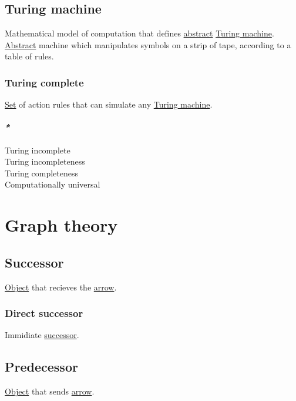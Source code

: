 \documentclass[a4paper,14pt,oneside]{book}
\begin{document}
\section{\label{org81c6fd8}Turing machine}
\label{sec:orgde2b43d}
Mathematical model of computation that defines \hyperref[org939195a]{abstract} \hyperref[org81c6fd8]{Turing machine}. \hyperref[org939195a]{Abstract} machine which manipulates symbols on a strip of tape, according to a table of rules.\\

\subsection{\label{orgddc98d2}Turing complete}
\label{sec:org16b19a2}

\hyperref[orgc6fbcf3]{Set} of action rules that can simulate any \hyperref[org81c6fd8]{Turing machine}.\\

\subsubsection{\emph{*}}
\label{sec:org5905706}

\label{orgc61f247}Turing incomplete\\
\label{orgddca697}Turing incompleteness\\
\label{orga0d5dad}Turing completeness\\
\label{org22aa47c}Computationally universal\\

\chapter{\label{orgdc1407f}Graph theory}
\label{sec:org2b05ad1}
\section{\label{org6aaae9e}Successor}
\label{sec:org492c9f8}
\hyperref[org65d2cb0]{Object} that recieves the \hyperref[org4fc25c7]{arrow}.\\

\subsection{\label{org3a4c687}Direct successor}
\label{sec:org3b3e0d7}
Immidiate \hyperref[org6aaae9e]{successor}.\\

\section{\label{orgb230c32}Predecessor}
\label{sec:orgbd9b3fe}
\hyperref[org65d2cb0]{Object} that sends \hyperref[org4fc25c7]{arrow}.\\
\end{document}
